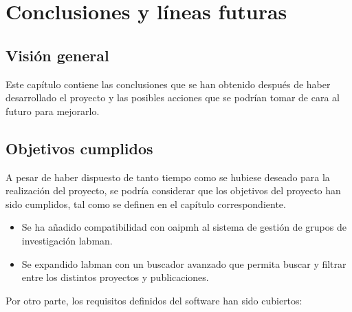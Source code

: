 \chapter{Conclusiones y líneas futuras}

\section{Visión general}

Este capítulo contiene las conclusiones que se han obtenido después de haber desarrollado el proyecto y las posibles acciones que se podrían tomar de cara al futuro para mejorarlo.

\section{Objetivos cumplidos}

A pesar de haber dispuesto de tanto tiempo como se hubiese deseado para la realización del proyecto, se podría considerar que los objetivos del proyecto han sido cumplidos, tal como se definen en el capítulo correspondiente.

\begin{itemize}
	\item Se ha añadido compatibilidad con \acrshort{oaipmh} al sistema de gestión de grupos de investigación \acrshort{labman}.
	\item Se expandido \acrshort{labman} con un buscador avanzado que permita buscar y filtrar entre los distintos proyectos y publicaciones.
\end{itemize}

Por otro parte, los requisitos definidos del software han sido cubiertos:

